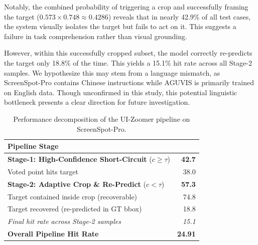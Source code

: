 \documentclass{article}
\theoremstyle{plain}
\theoremstyle{definition}
\theoremstyle{remark}
\begin{document}
Notably, the combined probability of triggering a crop and successfully framing the target ($0.573 \times 0.748 \approx 0.4286$) reveals that in nearly 42.9\% of all test cases, the system visually isolates the target but fails to act on it. This suggests a failure in task comprehension rather than visual grounding. 

However, within this successfully cropped subset, the model correctly re-predicts the target only 18.8\% of the time. This yields a 15.1\% hit rate across all Stage-2 samples.  We hypothesize this may stem from a language mismatch, as ScreenSpot-Pro contains Chinese instructions while AGUVIS is primarily trained on English data. Though unconfirmed in this study, this potential linguistic bottleneck presents a clear direction for future investigation.

\begin{table}[H]
    \vspace{-1.5em}
    \centering
    \caption{Performance decomposition of the UI-Zoomer pipeline on ScreenSpot-Pro. }
    \label{tab:uizoomer-breakdown}
    \begin{tabular}{@{}lr@{}}
        \toprule
        \textbf{Pipeline Stage} & \\%
        \midrule
        \textbf{Stage-1: High-Confidence Short-Circuit} ($c \geq \tau$) & \textbf{42.7} \\
        \quad Voted point hits target & 38.0 \\
        \addlinespace
        \textbf{Stage-2: Adaptive Crop \& Re-Predict} ($c < \tau$) & \textbf{57.3} \\
        \quad Target contained inside crop (recoverable) & 74.8 \\
        \quad Target recovered (re-predicted in GT bbox) & 18.8 \\
        \quad \textit{Final hit rate across Stage-2 samples} & \textit{15.1} \\
        \midrule
        \textbf{Overall Pipeline Hit Rate} & \textbf{24.91} \\
        \bottomrule
    \end{tabular}
    \vspace{-1.5em}
\end{table}
\end{document}
